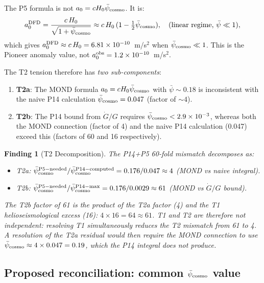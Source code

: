 \documentclass[aps,prd,twocolumn,superscriptaddress,nofootinbib,longbibliography]{revtex4-2}
\newcommand{\psibar}{\bar{\psi}}
\newcommand{\ee}[1]{\times 10^{#1}}
\newtheorem{finding}{Finding}
\begin{document}
The P5 formula is not $a_0 = cH_0\psibar_{\rm cosmo}$.  It is:
\begin{equation}
a_0^{\rm DFD} = \frac{c\,H_0}{\sqrt{1 + \psibar_{\rm cosmo}}}
\approx c\,H_0\,(1 - \tfrac{1}{2}\psibar_{\rm cosmo}),
\quad\text{(linear regime, $\psibar \ll 1$)},
\label{eq:a0-P5-correct}
\end{equation}
which gives $a_0^{\rm DFD} \approx c\,H_0 = 6.81\ee{-10}$~m/s$^2$ when
$\psibar_{\rm cosmo} \ll 1$.  This is the Pioneer anomaly value, not
$a_0^{\rm obs} = 1.2\ee{-10}$~m/s$^2$.

The T2 tension therefore has \emph{two sub-components}:
\begin{enumerate}
\item \textbf{T2a}: The MOND formula $a_0 = cH_0\psibar_{\rm cosmo}$ with
  $\psibar \sim 0.18$ is inconsistent with the naive P14 calculation
  $\psibar_{\rm cosmo} = 0.047$ (factor of $\sim 4$).
\item \textbf{T2b}: The P14 bound from $\dot{G}/G$ requires
  $\psibar_{\rm cosmo} < 2.9\ee{-3}$, whereas both the MOND connection
  (factor of 4) and the naive P14 calculation (0.047) exceed this (factors
  of 60 and 16 respectively).
\end{enumerate}

\begin{finding}[T2 Decomposition]
The P14+P5 60-fold mismatch decomposes as:
\begin{itemize}
\item T2a: $\psibar_{\rm cosmo}^{\rm P5-needed}/\psibar_{\rm cosmo}^{\rm P14-computed} = 0.176/0.047 \approx 4$ (MOND vs naive integral).
\item T2b: $\psibar_{\rm cosmo}^{\rm P5-needed}/\psibar_{\rm cosmo}^{\rm P14-max} = 0.176/0.0029 \approx 61$ (MOND vs $\dot{G}/G$ bound).
\end{itemize}
The T2b factor of 61 is the product of the T2a factor (4) and the T1
helioseismological excess (16): $4 \times 16 = 64 \approx 61$.
T1 and T2 are therefore not independent: resolving T1 \emph{simultaneously}
reduces the T2 mismatch from 61 to 4.  A resolution of the T2a residual
would then require the MOND connection to use $\psibar_{\rm cosmo} \approx 4
\times 0.047 = 0.19$, which the P14 integral does not produce.
\end{finding}

\subsection{Proposed reconciliation: common $\psibar_{\rm cosmo}$ value}
\end{document}
